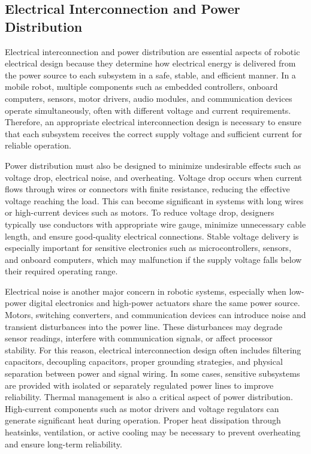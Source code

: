 
\subsection{Electrical Interconnection and Power Distribution}

Electrical interconnection and power distribution are essential aspects of robotic electrical design because they determine how electrical energy is delivered from the power source to each subsystem in a safe, stable, and efficient manner. In a mobile robot, multiple components such as embedded controllers, onboard computers, sensors, motor drivers, audio modules, and communication devices operate simultaneously, often with different voltage and current requirements. Therefore, an appropriate electrical interconnection design is necessary to ensure that each subsystem receives the correct supply voltage and sufficient current for reliable operation.

Power distribution must also be designed to minimize undesirable effects such as voltage drop, electrical noise, and overheating. Voltage drop occurs when current flows through wires or connectors with finite resistance, reducing the effective voltage reaching the load. This can become significant in systems with long wires or high-current devices such as motors. To reduce voltage drop, designers typically use conductors with appropriate wire gauge, minimize unnecessary cable length, and ensure good-quality electrical connections. Stable voltage delivery is especially important for sensitive electronics such as microcontrollers, sensors, and onboard computers, which may malfunction if the supply voltage falls below their required operating range.

Electrical noise is another major concern in robotic systems, especially when low-power digital electronics and high-power actuators share the same power source. Motors, switching converters, and communication devices can introduce noise and transient disturbances into the power line. These disturbances may degrade sensor readings, interfere with communication signals, or affect processor stability. For this reason, electrical interconnection design often includes filtering capacitors, decoupling capacitors, proper grounding strategies, and physical separation between power and signal wiring. In some cases, sensitive subsystems are provided with isolated or separately regulated power lines to improve reliability. Thermal management is also a critical aspect of power distribution. High-current components such as motor drivers and voltage regulators can generate significant heat during operation. Proper heat dissipation through heatsinks, ventilation, or active cooling may be necessary to prevent overheating and ensure long-term reliability.

